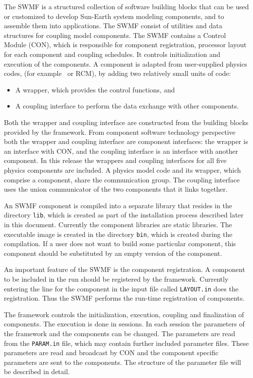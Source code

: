The SWMF is a structured collection of software building blocks that
can be used or customized to develop Sun-Earth system modeling
components, and to assemble them into applications. The SWMF consist
of utilities and data structures for coupling model components. The
SWMF contains a Control Module (CON), which is responsible for
component registration, processor layout for each component and
coupling schedules.  It controls initialization and execution of the
components. A component is adapted from user-supplied physics codes,
(for example \BATSRUS\ or RCM), by adding two relatively small units
of code:
\begin{itemize}
\item A wrapper, which provides the control functions, and
\item A coupling interface to perform the data exchange with other
components.
\end{itemize}
Both the wrapper and coupling interface are constructed from the
building blocks provided by the framework. From 
component software technology perspective both the wrapper and
coupling interface are component interfaces: the wrapper is an
interface with CON, and the coupling interface is an interface with
another component. In this release the wrappers and coupling
interfaces for all five physics components are included. A physics
model code and its wrapper, which comprise a component, share the
communication group.  The coupling interface uses the union
communicator of the two components that it links together.

An SWMF component is compiled into a separate library that resides in
the directory {\tt lib}, which is created as part of the installation
process described later in this document.  Currently the component
libraries are static libraries. The executable image is created in the
directory {\tt bin}, which is created during the compilation.  If a
user does not want to build some particular component, this component
should be substituted by an empty version of the component.

An important feature of the SWMF is the component registration.  A
component to be included in the run should be registered by the
framework.  Currently entering the line for the component in the input
file called {\tt LAYOUT.in} does the registration.  Thus the SWMF
performs the run-time registration of components.

The framework controls the initialization, execution, coupling and
finalization of components.  The execution is done in sessions. In
each session the parameters of the framework and the components can be
changed.  The parameters are read from the {\tt PARAM.in} file, which
may contain further included parameter files.  These parameters are
read and broadcast by CON and the component specific parameters are
sent to the components. The structure of the parameter file will be
described in detail.


